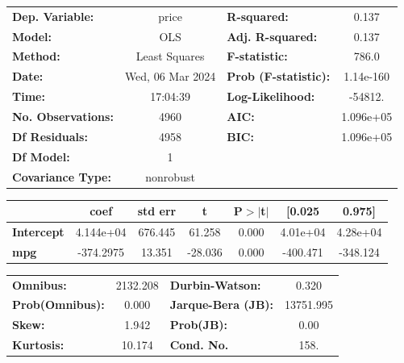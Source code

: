 \documentclass[
  letterpaper,
  DIV=11,
  numbers=noendperiod]{scrreprt}
\begin{document}
\begin{center}
\begin{tabular}{lclc}
\toprule
\textbf{Dep. Variable:}    &      price       & \textbf{  R-squared:         } &     0.137   \\
\textbf{Model:}            &       OLS        & \textbf{  Adj. R-squared:    } &     0.137   \\
\textbf{Method:}           &  Least Squares   & \textbf{  F-statistic:       } &     786.0   \\
\textbf{Date:}             & Wed, 06 Mar 2024 & \textbf{  Prob (F-statistic):} & 1.14e-160   \\
\textbf{Time:}             &     17:04:39     & \textbf{  Log-Likelihood:    } &   -54812.   \\
\textbf{No. Observations:} &        4960      & \textbf{  AIC:               } & 1.096e+05   \\
\textbf{Df Residuals:}     &        4958      & \textbf{  BIC:               } & 1.096e+05   \\
\textbf{Df Model:}         &           1      & \textbf{                     } &             \\
\textbf{Covariance Type:}  &    nonrobust     & \textbf{                     } &             \\
\bottomrule
\end{tabular}
\begin{tabular}{lcccccc}
                   & \textbf{coef} & \textbf{std err} & \textbf{t} & \textbf{P$> |$t$|$} & \textbf{[0.025} & \textbf{0.975]}  \\
\midrule
\textbf{Intercept} &    4.144e+04  &      676.445     &    61.258  &         0.000        &     4.01e+04    &     4.28e+04     \\
\textbf{mpg}       &    -374.2975  &       13.351     &   -28.036  &         0.000        &     -400.471    &     -348.124     \\
\bottomrule
\end{tabular}
\begin{tabular}{lclc}
\textbf{Omnibus:}       & 2132.208 & \textbf{  Durbin-Watson:     } &     0.320  \\
\textbf{Prob(Omnibus):} &   0.000  & \textbf{  Jarque-Bera (JB):  } & 13751.995  \\
\textbf{Skew:}          &   1.942  & \textbf{  Prob(JB):          } &      0.00  \\
\textbf{Kurtosis:}      &  10.174  & \textbf{  Cond. No.          } &      158.  \\
\bottomrule
\end{tabular}
\end{center}
\end{document}

